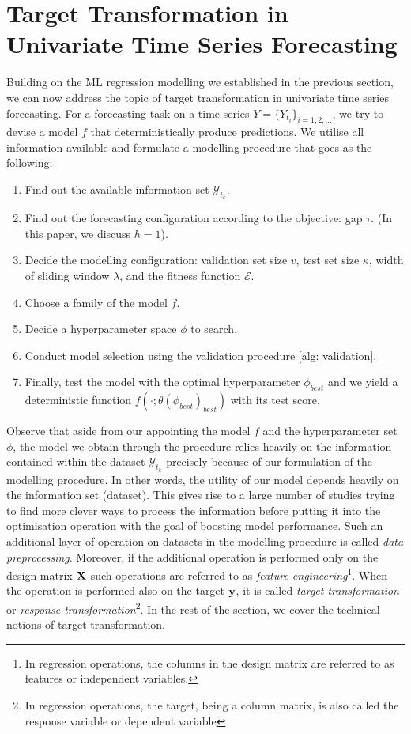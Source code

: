 \section{Target Transformation in Univariate Time Series Forecasting}

Building on the ML regression modelling we established in the previous section, we can now address the topic of target transformation in univariate time series forecasting. For a forecasting task on a time series $Y = \{ Y_{t_i} \}_{i = 1, 2, \ldots}$, we try to devise a model $f$ that deterministically produce predictions. We utilise all information available and formulate a modelling procedure that goes as the following:
\begin{enumerate}
    \item Find out the available information set $\mathcal{Y}_{t_k}$.
    \item Find out the forecasting configuration according to the objective: gap $\tau$. (In this paper, we discuss $h=1$).
    \item Decide the modelling configuration: validation set size $v$, test set size $\kappa$, width of sliding window $\lambda$, and the fitness function $\mathcal{E}$.
    \item Choose a family of the model $f$.
    \item Decide a hyperparameter space $\phi$ to search.
    \item Conduct model selection using the validation procedure \ref{alg: validation}.
    \item Finally, test the model with the optimal hyperparameter $\phi_{best}$ and we yield a deterministic function $f(\cdot;\theta(\phi_{best})_{best})$ with its test score.
\end{enumerate}
Observe that aside from our appointing the model $f$ and the hyperparameter set $\phi$, the model we obtain through the procedure relies heavily on the information contained within the dataset $\mathcal{Y}_{t_k}$ precisely because of our formulation of the modelling procedure. In other words, the utility of our model depends heavily on the information set (dataset). This gives rise to a large number of studies trying to find more clever ways to process the information before putting it into the optimisation operation with the goal of boosting model performance. Such an additional layer of operation on datasets in the modelling procedure is called \textit{data preprocessing}. Moreover, if the additional operation is performed only on the design matrix $\mathbf{X}$ such operations are referred to as \textit{feature engineering}\footnote{In regression operations, the columns in the design matrix are referred to as features or independent variables.}. When the operation is performed also on the target $\mathbf{y}$, it is called \textit{target transformation} or \textit{response transformation}\footnote{In regression operations, the target, being a column matrix, is also called the response variable or dependent variable}. In the rest of the section, we cover the technical notions of target transformation.

